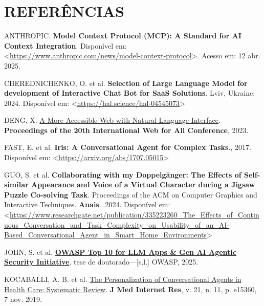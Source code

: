 \documentclass[
]{article}
\newlength{\cslhangindent}
\newenvironment{CSLReferences}[2] %
 {\begin{list}{}{%
  \setlength{\itemindent}{0pt}
  \setlength{\leftmargin}{0pt}
  \setlength{\parsep}{0pt}
  \ifodd #1
   \setlength{\leftmargin}{\cslhangindent}
   \setlength{\itemindent}{-1\cslhangindent}
  \fi
  \setlength{\itemsep}{#2\baselineskip}}}
 {\end{list}}
\begin{document}
\section*{REFERÊNCIAS}\label{referuxeancias}

\label{refs}
\begin{CSLReferences}{0}{1}
ANTHROPIC. \textbf{Model Context Protocol (MCP): A Standard for AI
Context Integration}. Disponível em:
\textless{}\url{https://www.anthropic.com/news/model-context-protocol}\textgreater.
Acesso em: 12 abr. 2025.

CHEREDNICHENKO, O. et al. \textbf{Selection of Large Language Model for
development of Interactive Chat Bot for SaaS Solutions}. Lviv, Ukraine:
2024. Disponível em:
\textless{}\url{https://hal.science/hal-04545073}\textgreater{}

DENG, X. \href{https://api.semanticscholar.org/CorpusID:258259387}{A
More Accessible Web with Natural Language Interface}.
\textbf{Proceedings of the 20th International Web for All Conference},
2023.

FAST, E. et al. \textbf{Iris: A Conversational Agent for Complex
Tasks}., 2017. Disponível em:
\textless{}\url{https://arxiv.org/abs/1707.05015}\textgreater{}

GUO, S. et al. \textbf{Collaborating with my Doppelgänger: The Effects
of Self-similar Appearance and Voice of a Virtual Character during a
Jigsaw Puzzle Co-solving Task}. Proceedings of the ACM on Computer
Graphics and Interactive Techniques. \textbf{Anais}...2024. Disponível
em:
\textless{}\url{https://www.researchgate.net/publication/335223260_The_Effects_of_Continuous_Conversation_and_Task_Complexity_on_Usability_of_an_AI-Based_Conversational_Agent_in_Smart_Home_Environments}\textgreater{}

JOHN, S. et al.
\textbf{\href{https://genai.owasp.org/llmrisk/llm01-prompt-injection}{OWASP
Top 10 for LLM Apps \& Gen AI Agentic Security Initiative}}. tese de
doutorado---{[}s.l.{]} OWASP, 2025.

KOCABALLI, A. B. et al. \href{https://doi.org/10.2196/15360}{The
Personalization of Conversational Agents in Health Care: Systematic
Review}. \textbf{J Med Internet Res}, v. 21, n. 11, p. e15360, 7 nov.
2019.


\end{CSLReferences}
\end{document}
